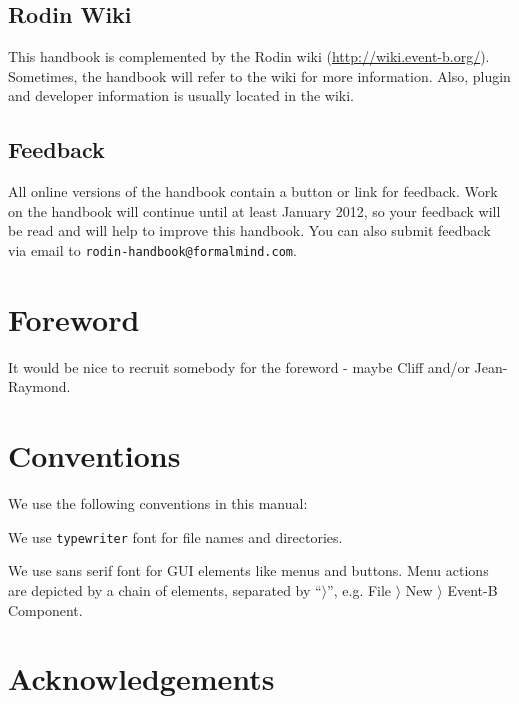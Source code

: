 \documentclass[12pt]{book}
\begin{document}
\subsection{Rodin Wiki}
\label{rodin_wiki}

This handbook is complemented by the Rodin wiki (\url{http://wiki.event-b.org/}).  Sometimes, the handbook will refer to the wiki for more information.  Also, plugin and developer information is usually located in the wiki.

\subsection{Feedback}
\label{feedback}

All online versions of the handbook contain a button or link for feedback.  Work on the handbook will continue until at least January 2012, so your feedback will be read and will help to improve this handbook.  You can also submit feedback via email to \texttt{rodin-handbook@formalmind.com}.

\section{Foreword}
\label{foreword}

It would be nice to recruit somebody for the foreword - maybe Cliff and/or Jean-Raymond.

\section{Conventions}
\label{conventions}

We use the following conventions in this manual:


We use \texttt{typewriter} font for file names and directories.

We use \textsf{sans serif font} for GUI elements like menus and buttons.  Menu actions are depicted by a chain of elements, separated by ``$\rangle$'', e.g. \textsf{File $\rangle$ New $\rangle$ Event-B Component}.

\section{Acknowledgements}
\label{sec:acknowledgements}
\end{document}
